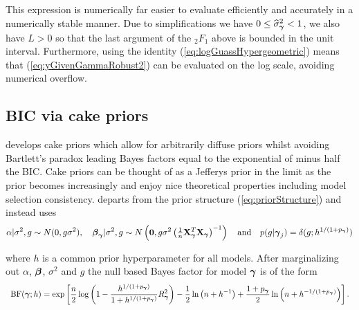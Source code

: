 \noindent This expression is numerically far easier to evaluate efficiently and accurately in a numerically stable manner. Due to simplifications
we have $0\le \widehat{\sigma}_{\boldsymbol \gamma}^2<1$, we also have $L>0$ so that the last argument
of the ${}_2F_1$ above is bounded in the unit interval. Furthermore, using
the identity (\ref{eq:logGuassHypergeometric}) means that (\ref{eq:yGivenGammaRobust2}) can be evaluated
on the log scale, avoiding numerical overflow.





\subsection{BIC via cake priors}  

\cite{OrmerodEtal2017} develops cake priors which allow for arbitrarily diffuse priors
whilst avoiding Bartlett's paradox leading Bayes factors equal to the exponential of minus half
the BIC. Cake priors
can be thought of as a Jefferys prior in the limit
as the prior becomes increasingly
and enjoy nice theoretical properties including model
selection consistency. \cite{OrmerodEtal2017} 
departs from the prior structure (\ref{eq:priorStructure}) and instead uses
\begin{equation}\label{eq:proirs2}
\displaystyle \alpha|\sigma^2,g \sim N(0,g\sigma^2), \quad 
\displaystyle {\boldsymbol\beta}_{\boldsymbol \gamma}|\sigma^2,g \sim N\left( {\bf 0},g\sigma^2\left( \tfrac{1}{n}{\bf X}_{\boldsymbol \gamma}^T{\bf X}_{\boldsymbol \gamma}\right)^{-1}\right)
\quad \mbox{and} \quad
p(g|{\boldsymbol \gamma}_j) = \delta(g; h^{1/(1 + p_{\boldsymbol \gamma})})
\end{equation}

\noindent where $h$ is a common prior hyperparameter for all models. After marginalizing
out $\alpha$, ${\boldsymbol \beta}$, $\sigma^2$ and $g$ the null based Bayes factor 
for model ${\boldsymbol \gamma}$ is of the form
$$
\begin{array}{rl}
\displaystyle \mbox{BF}({\boldsymbol \gamma};h)
=
\exp\left[
\frac{n}{2}\log\left( 1 - \frac{h^{1/(1+p_{\boldsymbol \gamma})}}{1+h^{1/(1+p_{\boldsymbol \gamma})}} R_{\boldsymbol \gamma}^2 \right) 
- \frac{1}{2}\ln\left(n + h^{-1} \right)
+ \frac{1+p_{\boldsymbol \gamma}}{2}\ln\left(n + h^{-1/(1+p_{\boldsymbol \gamma})} \right)
\right].
\end{array}
$$

